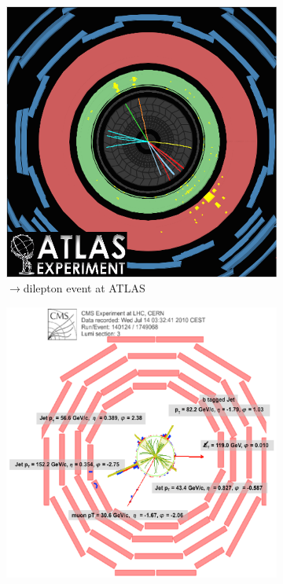 \begin{figure}[thbp]
  \centering
  \begin{subfigure}[t]{0.30\textheight}
    \includegraphics[height=0.30\textheight]{PartTopQuark/Diagrams/atlas-2010-063-fig_09.png}
    \caption{\ttbar$\rightarrow$dilepton event at ATLAS } \label{fig:TopQuarkEventDisplayAtlas}
  \end{subfigure} %
  \hfill
  \begin{subfigure}[t]{0.30\textheight}
    \includegraphics[height=0.30\textheight]{PartTopQuark/Diagrams/cms-mu4Jets_140124_1749068_RPhi.png}

\end{subfigure}
\end{figure}
